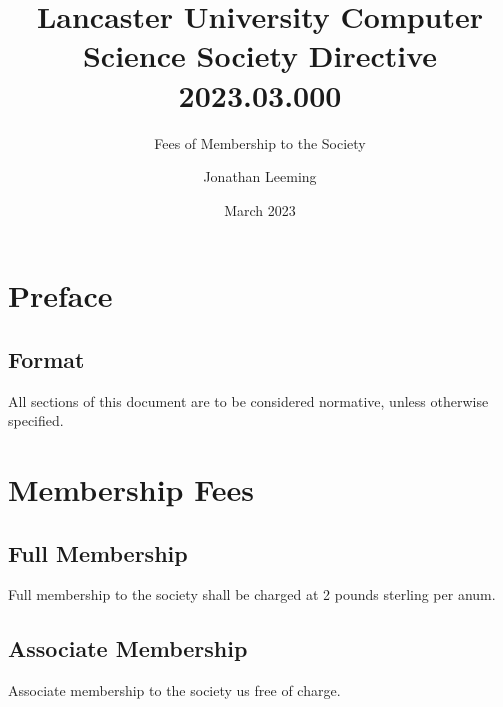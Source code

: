 \documentclass{scrartcl}
\title{Lancaster University Computer Science Society Directive 2023.03.000}
\subtitle{Fees of Membership to the Society}
\author{Jonathan Leeming}
\date{March 2023}
\begin{document}
    \maketitle
    
    \clearpage
    \tableofcontents

    \clearpage
    \section{Preface}
        \label{preface}
        \subsection{Format}
            \label{preface--format}
            All sections of this document are to be considered normative, unless otherwise specified.

    \section{Membership Fees}
        \label{fees}
        \subsection{Full Membership}
            \label{fees--full}
            Full membership to the society shall be charged at 2 pounds sterling per anum.

        \subsection{Associate Membership}
            \label{fees-associate}
            Associate membership to the society us free of charge.
    \clearpage
\end{document}
